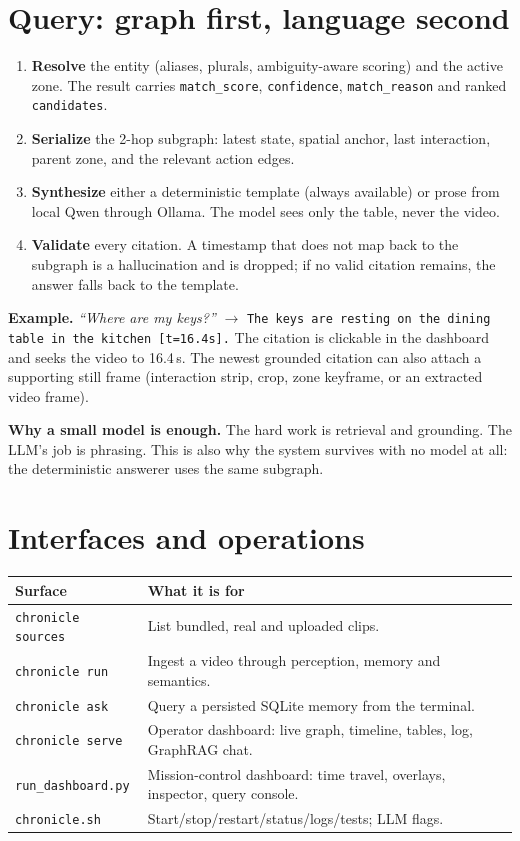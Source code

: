 \documentclass[10pt,a4paper]{article}
\newcommand{\code}[1]{\texttt{\small #1}}
\newcommand{\panel}[1]{%
  \noindent\colorbox{panel}{%
    \begin{minipage}{\dimexpr\linewidth-2\fboxsep\relax}
    \vspace{1pt}#1\vspace{2pt}
    \end{minipage}}%
}
\begin{document}
\section{Query: graph first, language second}

\begin{enumerate}[leftmargin=1.1em,itemsep=1pt,topsep=1pt]
  \item \textbf{Resolve} the entity (aliases, plurals, ambiguity-aware scoring) and the active
  zone. The result carries \code{match\_score}, \code{confidence}, \code{match\_reason} and ranked
  \code{candidates}.
  \item \textbf{Serialize} the 2-hop subgraph: latest state, spatial anchor, last interaction,
  parent zone, and the relevant action edges.
  \item \textbf{Synthesize} either a deterministic template (always available) or prose from
  local Qwen through Ollama. The model sees only the table, never the video.
  \item \textbf{Validate} every citation. A timestamp that does not map back to the subgraph is a
  hallucination and is dropped; if no valid citation remains, the answer falls back to the
  template.
\end{enumerate}

\panel{
\textbf{Example.} \emph{``Where are my keys?''} $\rightarrow$
\texttt{The keys are resting on the dining table in the kitchen [t=16.4s].}
The citation is clickable in the dashboard and seeks the video to 16.4\,s. The newest grounded
citation can also attach a supporting still frame (interaction strip, crop, zone keyframe, or an
extracted video frame).
}

\textbf{Why a small model is enough.} The hard work is retrieval and grounding. The LLM's job is
phrasing. This is also why the system survives with no model at all: the deterministic answerer
uses the same subgraph.

\section{Interfaces and operations}

\begin{center}
\begin{tabularx}{\linewidth}{@{}lX@{}}
\toprule
\textbf{Surface} & \textbf{What it is for} \\
\midrule
\code{chronicle sources} & List bundled, real and uploaded clips. \\
\code{chronicle run} & Ingest a video through perception, memory and semantics. \\
\code{chronicle ask} & Query a persisted SQLite memory from the terminal. \\
\code{chronicle serve} & Operator dashboard: live graph, timeline, tables, log, GraphRAG chat. \\
\code{run\_dashboard.py} & Mission-control dashboard: time travel, overlays, inspector, query console. \\
\code{chronicle.sh} & Start/stop/restart/status/logs/tests; LLM flags. \\
\bottomrule
\end{tabularx}
\end{center}
\end{document}
